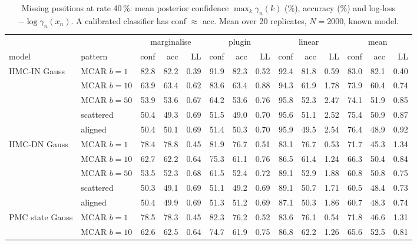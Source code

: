 \begin{table}[htbp]
  \centering
  \small
  \setlength{\tabcolsep}{4pt}
  \caption{Missing positions at rate 40\,\%: mean posterior confidence $\max_k \gamma_n(k)$ (\%), accuracy (\%) and log-loss $-\log \gamma_n(x_n)$. A calibrated classifier has conf $\approx$ acc. Mean over 20 replicates, $N = 2000$, known model.}
  \label{tab:missing-overconfidence}
  \begin{tabular}{llrrrrrrrrrrrr}
    \toprule
     & & \multicolumn{3}{c}{marginalise} & \multicolumn{3}{c}{plugin} & \multicolumn{3}{c}{linear} & \multicolumn{3}{c}{mean} \\
    \cmidrule(lr){3-5}\cmidrule(lr){6-8}\cmidrule(lr){9-11}\cmidrule(lr){12-14}
    model & pattern & conf & acc & LL & conf & acc & LL & conf & acc & LL & conf & acc & LL \\
    \midrule
    HMC-IN Gauss & MCAR $b{=}1$ & 82.8 & 82.2 & 0.39 & 91.9 & 82.3 & 0.52 & 92.4 & 81.8 & 0.59 & 83.0 & 82.1 & 0.40 \\
     & MCAR $b{=}10$ & 63.9 & 63.4 & 0.62 & 83.6 & 63.4 & 0.88 & 94.3 & 61.9 & 1.78 & 73.9 & 60.4 & 0.74 \\
     & MCAR $b{=}50$ & 53.9 & 53.6 & 0.67 & 64.2 & 53.6 & 0.76 & 95.8 & 52.3 & 2.47 & 74.1 & 51.9 & 0.85 \\
     & scattered & 50.4 & 49.3 & 0.69 & 51.5 & 49.0 & 0.70 & 95.6 & 51.1 & 2.52 & 75.4 & 50.9 & 0.87 \\
     & aligned & 50.4 & 50.1 & 0.69 & 51.4 & 50.3 & 0.70 & 95.9 & 49.5 & 2.54 & 76.4 & 48.9 & 0.92 \\
    \addlinespace
    HMC-DN Gauss & MCAR $b{=}1$ & 78.4 & 78.8 & 0.45 & 81.9 & 76.7 & 0.51 & 83.1 & 76.7 & 0.53 & 71.7 & 45.3 & 1.34 \\
     & MCAR $b{=}10$ & 62.7 & 62.2 & 0.64 & 75.3 & 61.1 & 0.76 & 86.5 & 61.4 & 1.24 & 66.3 & 50.4 & 0.84 \\
     & MCAR $b{=}50$ & 53.5 & 52.3 & 0.68 & 61.5 & 52.4 & 0.72 & 89.1 & 52.9 & 1.88 & 60.8 & 50.8 & 0.75 \\
     & scattered & 50.3 & 49.1 & 0.69 & 51.1 & 49.2 & 0.69 & 89.1 & 50.7 & 1.71 & 60.5 & 48.4 & 0.73 \\
     & aligned & 50.4 & 49.9 & 0.69 & 51.3 & 51.2 & 0.69 & 87.1 & 50.3 & 1.86 & 60.7 & 48.3 & 0.74 \\
    \addlinespace
    PMC state Gauss & MCAR $b{=}1$ & 78.5 & 78.3 & 0.45 & 82.3 & 76.2 & 0.52 & 83.6 & 76.1 & 0.54 & 71.8 & 46.6 & 1.31 \\
     & MCAR $b{=}10$ & 62.6 & 62.5 & 0.64 & 74.7 & 61.9 & 0.75 & 86.8 & 62.2 & 1.26 & 65.6 & 52.5 & 0.81 \\

\end{tabular}
\end{table}
